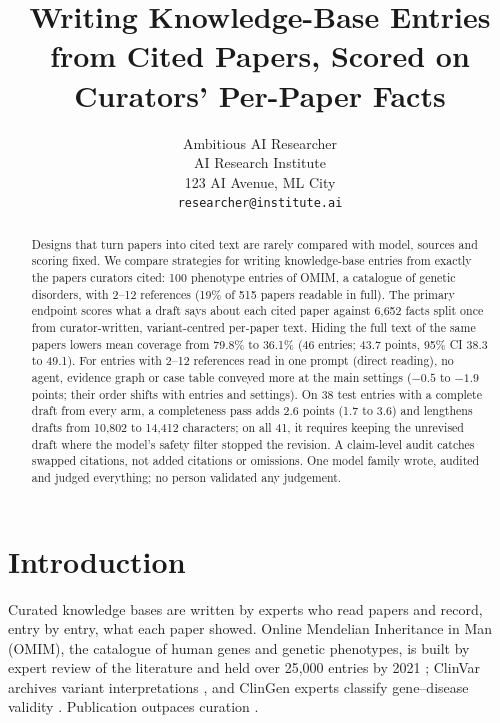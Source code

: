 \documentclass{article} %
\title{Writing Knowledge-Base Entries from Cited Papers, Scored on Curators' Per-Paper Facts}
\author{Ambitious AI Researcher\\
AI Research Institute\\
123 AI Avenue, ML City\\
\texttt{researcher@institute.ai}
}
\begin{document}
\maketitle

\begin{abstract}
Designs that turn papers into cited text are rarely compared with model, sources and scoring fixed. We compare strategies for writing knowledge-base entries from exactly the papers curators cited: 100 phenotype entries of OMIM, a catalogue of genetic disorders, with 2--12 references (19\% of 515 papers readable in full). The primary endpoint scores what a draft says about each cited paper against 6,652 facts split once from curator-written, variant-centred per-paper text. Hiding the full text of the same papers lowers mean coverage from 79.8\% to 36.1\% (46 entries; 43.7 points, 95\% CI 38.3 to 49.1). For entries with 2--12 references read in one prompt (direct reading), no agent, evidence graph or case table conveyed more at the main settings ($-0.5$ to $-1.9$ points; their order shifts with entries and settings). On 38 test entries with a complete draft from every arm, a completeness pass adds 2.6 points (1.7 to 3.6) and lengthens drafts from 10,802 to 14,412 characters; on all 41, it requires keeping the unrevised draft where the model's safety filter stopped the revision. A claim-level audit catches swapped citations, not added citations or omissions. One model family wrote, audited and judged everything; no person validated any judgement.
\end{abstract}

\section{Introduction}
\label{sec:intro}
Curated knowledge bases are written by experts who read papers and record, entry by entry, what each paper showed. Online Mendelian Inheritance in Man (OMIM), the catalogue of human genes and genetic phenotypes, is built by expert review of the literature and held over 25,000 entries by 2021 \citep{Amberger2014OmimorgOnline,amberger2019omim,hamosh2021online}; ClinVar archives variant interpretations \citep{Landrum2017ClinvarImproving,landrum2025clinvar}, and ClinGen experts classify gene--disease validity \citep{strande2017evaluating}. Publication outpaces curation \citep{caufield2024curategpt,Green2023LitsummLarge}.
\end{document}
